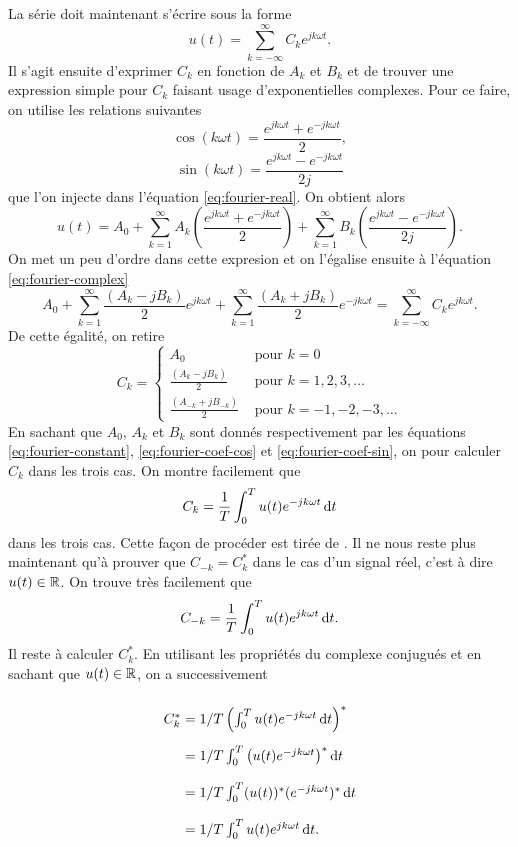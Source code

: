 La série doit maintenant s'écrire sous la
forme
\begin{equation}
	u(t) = \sum_{k=-\infty}^\infty C_k e^{jk\omega t}.
	\label{eq:fourier-complex}
\end{equation}
Il s'agit ensuite d'exprimer $C_k$ en fonction
de $A_k$ et $B_k$ et de trouver une expression
simple pour $C_k$ faisant usage d'exponentielles
complexes. Pour ce faire, on utilise les relations
suivantes
\[ \cos(k\omega t) = \frac{e^{jk\omega t}+e^{-jk\omega t}}{2},\]
\[ \sin(k\omega t) = \frac{e^{jk\omega t}-e^{-jk\omega t}}{2j}\]
que l'on injecte dans l'équation \ref{eq:fourier-real}. On obtient
alors
\[ u(t) = A_0 + \sum_{k=1}^{\infty} A_k\left(\frac{e^{jk\omega t}+e^{-jk\omega t}}{2}\right)
	+ \sum_{k=1}^{\infty} B_k\left(\frac{e^{jk\omega t}-e^{-jk\omega t}}{2j}\right). \]
On met un peu d'ordre dans cette expresion et on l'égalise 
ensuite à l'équation \ref{eq:fourier-complex}
\[ A_0 + \sum_{k=1}^{\infty} \frac{(A_k-jB_k)}{2}e^{jk\omega t}
	+ \sum_{k=1}^{\infty} \frac{(A_k+jB_k)}{2}e^{-jk\omega t} = 
	\sum_{k=-\infty}^\infty C_k e^{jk\omega t}.\]
De cette égalité, on retire
\[ C_k =
	\left\{
		\begin{array}{cl}
			A_0 & \text{ pour } k = 0 \\
			\frac{(A_k-jB_k)}{2} & \text{ pour } k = 1,2,3,\dots \\
			\frac{(A_{-k}+jB_{-k})}{2} & \text{ pour } k = -1,-2,-3,\dots
		\end{array}
	\right.
\]
En sachant que $A_0$, $A_k$ et $B_k$ sont
donnés respectivement par les équations
\ref{eq:fourier-constant}, \ref{eq:fourier-coef-cos}
et \ref{eq:fourier-coef-sin}, on pour calculer
$C_k$ dans les trois cas. On montre facilement que
\[ C_k = \frac{1}{T} \int_0^T u(t)e^{-jk\omega t}\operatorname{d}\! t\]
dans les trois cas. Cette façon de procéder est tirée de 
\cite{complex-fourier-series}.
Il ne nous reste plus maintenant qu'à prouver
que $C_{-k} = C_k^*$ dans le cas d'un signal réel,
c'est à dire $u(t) \in \mathbb{R}$. On trouve très facilement que
\begin{equation}
	C_{-k} = \frac{1}{T} \int_0^T u(t)e^{jk\omega t}\operatorname{d}\! t.
	\label{eq:c-minus}
\end{equation}
Il reste à calculer $C^*_k$. En utilisant les propriétés
du complexe conjugués et en sachant que $u(t) \in \mathbb{R}$,
on a successivement

\[\arraycolsep=1.4pt\def\arraystretch{2.2}
	\begin{array}{cl}
		C_k^* &= 1/T \left(\int_0^T u(t)e^{-jk\omega t} \dif t\right)^* \\ 
					&= 1/T \int_0^T \left(u(t)e^{-jk\omega t}\right)^* \dif t \\
					&= 1/T \int_0^T (u(t))^*(e^{-jk\omega t})^* \dif t \\
					&= 1/T \int_0^T u(t)e^{jk\omega t} \dif t.
	\end{array}
\]

